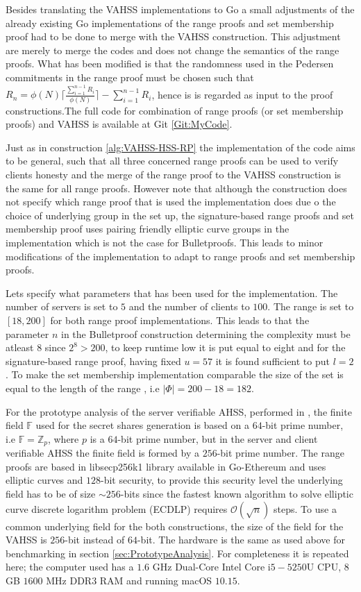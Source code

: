 Besides translating the VAHSS implementations to Go a small adjustments of the already existing Go implementations of the range proofs and set membership proof  had to be done to merge with the VAHSS construction. This adjustment are merely to merge the codes and does not change the semantics of the range proofs. What has been  modified is that the randomness used in the Pedersen commitments in the range proof must be chosen such that $R_n = \phi(N)\lceil \frac{\sum_{i=1}^{n-1}R_i}{\phi(N)}\rceil- \sum_{i=1}^{n-1}R_i$, hence is is regarded as input to the proof constructions.The full code for combination of range proofs (or set membership proofs) and VAHSS is available at Git \ref{Git:MyCode}. 

Just as in construction \ref{alg:VAHSS-HSS-RP} the implementation of the code aims to be  general, such that all three concerned range proofs can be used to verify clients honesty and the merge of the range proof to the VAHSS construction is the same for all range proofs. However note that although the construction does not specify which range proof that is used the implementation does due o the choice of underlying group in the set up, the signature-based range proofs and set membership proof uses pairing friendly elliptic curve groups in the implementation which is not the case for Bulletproofs. This leads to minor modifications of the implementation to adapt to range proofs and set membership proofs.

Lets specify what parameters that has been used for the implementation. The number of servers is set to $5$ and the number of clients to $100$.  The range is set to $[18,200]$ for both range proof implementations. This leads to that the parameter $n$ in the Bulletproof construction determining the complexity must be atleast $8$ since $2^8>200$, to keep runtime low it is put equal to eight and for the signature-based range proof, having fixed $u=57$ it is found sufficient to put $l=2$. To make the set membership implementation comparable the size of the set is equal to the length of the range , i.e $|\Phi|=200-18 = 182$.

 For the prototype analysis of the server verifiable AHSS, performed in \cite{VAHSS}, the finite field $\mathds{F}$ used for the secret shares generation is based on a $64$-bit prime number, i.e $\mathds{F}=\mathds{Z}_p$, where $p$ is a $64$-bit prime number,  but in the server and client verifiable AHSS the finite field is formed by a $256$-bit prime number.  The range proofs are based in libsecp256k1 library available in Go-Ethereum and uses elliptic curves and $128$-bit security, to provide this security level the underlying field has to be of size $\sim 256$-bits since the fastest known algorithm to solve elliptic curve discrete logarithm problem (ECDLP) requires $\mathcal{O}(\sqrt{n})$ steps. To use a common underlying field  for the both constructions,  the size of the field for the VAHSS is $256$-bit instead of $64$-bit. The hardware is the same as used above for benchmarking in section \ref{sec:PrototypeAnalysis}. For completeness it is repeated here; the computer used has a $1.6$ GHz Dual-Core Intel Core i$5-5250$U CPU, $8$GB $1600$ MHz DDR3 RAM  and running macOS $10.15$. 




